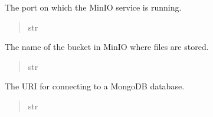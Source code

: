\documentclass[letterpaper,10pt,english]{sphinxmanual}
\begin{document}
\begin{fulllineitems}
\begin{fulllineitems}
\begin{quote}
\begin{description}
\end{description}\end{quote}

\end{fulllineitems}


\begin{fulllineitems}
\label{\detokenize{config:config.db.DataBaseSettings.MINIO_PORT}}
\pysigstartsignatures
{}
\pysigstopsignatures
\sphinxAtStartPar
The port on which the MinIO service is running.
\begin{quote}\begin{description}
\sphinxAtStartPar
str

\end{description}\end{quote}

\end{fulllineitems}


\begin{fulllineitems}
\label{\detokenize{config:config.db.DataBaseSettings.MINIO_BUCKET_NAME}}
\pysigstartsignatures
{}
\pysigstopsignatures
\sphinxAtStartPar
The name of the bucket in MinIO where files are stored.
\begin{quote}\begin{description}
\sphinxAtStartPar
str

\end{description}\end{quote}

\end{fulllineitems}


\begin{fulllineitems}
\label{\detokenize{config:config.db.DataBaseSettings.MONGO_URI}}
\pysigstartsignatures
{}
\pysigstopsignatures
\sphinxAtStartPar
The URI for connecting to a MongoDB database.
\begin{quote}\begin{description}
\sphinxAtStartPar
str


\end{description}
\end{quote}
\end{fulllineitems}
\end{fulllineitems}
\end{document}

